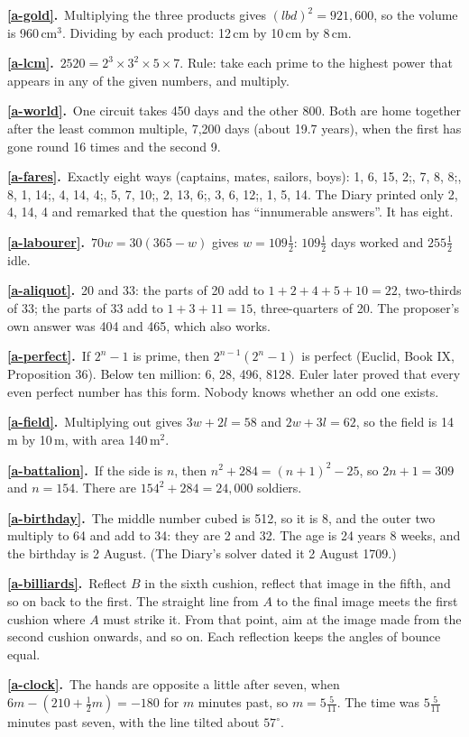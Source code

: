 \documentclass[11pt,a4paper]{article}
\newcommand{\ans}[2]{\par\smallskip\noindent\textbf{\ref{#1}.}\ #2}
\begin{document}
\ans{a-gold}{Multiplying the three products gives $(lbd)^2 = 921{,}600$, so the volume is
960\,cm$^3$. Dividing by each product: 12\,cm by 10\,cm by 8\,cm.}
\ans{a-lcm}{$2520 = 2^3\times3^2\times5\times7$. Rule: take each prime to the highest
power that appears in any of the given numbers, and multiply.}
\ans{a-world}{One circuit takes 450 days and the other 800. Both are home together after
the least common multiple, 7,200 days (about 19.7 years), when the first has gone round
16 times and the second 9.}
\ans{a-fares}{Exactly eight ways (captains, mates, sailors, boys): 1, 6, 15, 2;\quad
1, 7, 8, 8;\quad 1, 8, 1, 14;\quad 2, 4, 14, 4;\quad 2, 5, 7, 10;\quad 3, 2, 13, 6;\quad
3, 3, 6, 12;\quad 4, 1, 5, 14. The Diary printed only 2, 4, 14, 4 and remarked that the
question has ``innumerable answers''. It has eight.}
\ans{a-labourer}{$70w = 30(365-w)$ gives $w = 109\tfrac12$: $109\tfrac12$ days worked and
$255\tfrac12$ idle.}
\ans{a-aliquot}{20 and 33: the parts of 20 add to $1+2+4+5+10 = 22$, two-thirds of 33;
the parts of 33 add to $1+3+11 = 15$, three-quarters of 20. The proposer's own answer was
404 and 465, which also works.}
\ans{a-perfect}{If $2^n-1$ is prime, then $2^{n-1}(2^n-1)$ is perfect (Euclid, Book IX,
Proposition 36). Below ten million: 6, 28, 496, 8128. Euler later proved that every even
perfect number has this form. Nobody knows whether an odd one exists.}
\ans{a-field}{Multiplying out gives $3w + 2l = 58$ and $2w + 3l = 62$, so the field is
14\,m by 10\,m, with area 140\,m$^2$.}
\ans{a-battalion}{If the side is $n$, then $n^2+284 = (n+1)^2-25$, so $2n+1 = 309$ and
$n = 154$. There are $154^2+284 = 24{,}000$ soldiers.}
\ans{a-birthday}{The middle number cubed is 512, so it is 8, and the outer two multiply
to 64 and add to 34: they are 2 and 32. The age is 24 years 8 weeks, and the birthday is
2 August. (The Diary's solver dated it 2 August 1709.)}
\ans{a-billiards}{Reflect $B$ in the sixth cushion, reflect that image in the fifth, and
so on back to the first. The straight line from $A$ to the final image meets the first
cushion where $A$ must strike it. From that point, aim at the image made from the second
cushion onwards, and so on. Each reflection keeps the angles of bounce equal.}
\ans{a-clock}{The hands are opposite a little after seven, when
$6m - (210 + \tfrac12 m) = -180$ for $m$ minutes past, so $m = 5\tfrac{5}{11}$. The time
was $5\tfrac{5}{11}$ minutes past seven, with the line tilted about $57^\circ$.}
\end{document}
